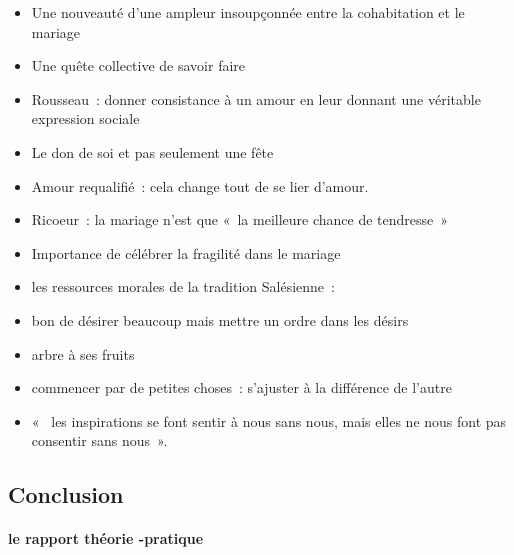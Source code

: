 \begin{itemize}
\item
  Une nouveauté d'une ampleur insoupçonnée entre la cohabitation et le
  mariage
\item
  Une quête collective de savoir faire
\item
   
  Rousseau~: donner consistance à un amour en leur donnant une véritable
  expression sociale
   
\item
  Le don de soi et pas seulement une fête
\item
   
  Amour requalifié~: cela change tout de se lier d'amour.
   
\item
   
  Ricoeur~: la mariage n'est que «~la meilleure chance de tendresse~»
   
\item
  Importance de célébrer la fragilité dans le mariage
\item
  les ressources morales de la tradition Salésienne~:
\item
   
  bon de désirer beaucoup mais mettre un ordre dans les désirs
   
\item
   
  arbre à ses fruits
   
\item
   
  commencer par de petites choses~: s'ajuster à la différence de l'autre
   
\item
   
  «~ les inspirations se font sentir à nous sans nous, mais elles ne
  nous font pas consentir sans nous~».
   
\end{itemize}

\hypertarget{conclusion}{%
\subsection{Conclusion}\label{conclusion}}

\hypertarget{a.-le-rapport-thuxe9orie--pratique}{%
\paragraph{le rapport théorie
-pratique}\label{a.-le-rapport-thuxe9orie--pratique}}

